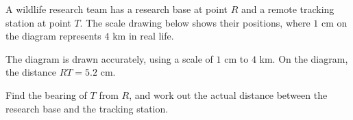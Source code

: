 \begin{question}
\noindent A wildlife research team has a research base at point $R$ and a remote tracking station at point $T$. The scale drawing below shows their positions, where $1$ cm on the diagram represents $4$ km in real life.

\begin{center}
\end{center}

\noindent The diagram is drawn accurately, using a scale of $1$ cm to $4$ km. On the diagram, the distance $RT = 5.2$ cm.

\noindent Find the bearing of $T$ from $R$, and work out the actual distance between the research base and the tracking station.

\vspace{4cm}

\begin{flushright}
\end{flushright}
\end{question}